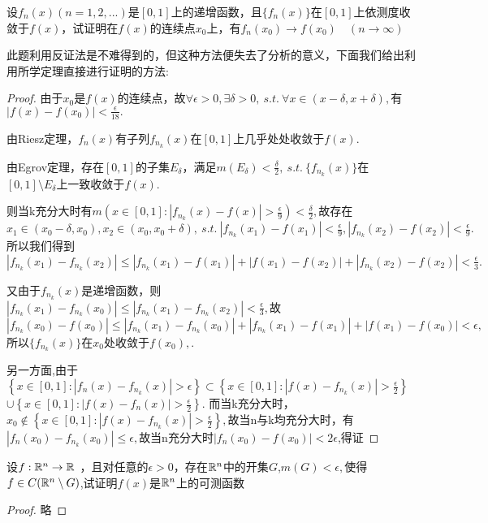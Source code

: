 设$f_n(x)(n=1,2,...)$是$[0,1]$上的递增函数，且$\{f_n(x)\}$在$[0,1]$上依测度收敛于$f(x)$，试证明在$f(x)$的连续点$x_0$上，有$f_n(x_0)\to f(x_0)\quad(n\to\infty)$\par
 此题利用反证法是不难得到的，但这种方法便失去了分析的意义，下面我们给出利用所学定理直接进行证明的方法:
\begin{proof}
	由于$x_0$是$f(x)$的连续点，故$\forall \epsilon>0,\exists\delta>0,\ s.t.\ \forall x\in(x-\delta,x+\delta),$有$\displaystyle{|f(x)-f(x_0)|<\frac{\epsilon}{18}}.\ $\par 由Riesz定理，$f_n(x)$有子列$f_{n_k}(x)$在$[0,1]$上几乎处处收敛于$f(x)$.\par 由Egrov定理，存在$[0,1]$的子集$E_\delta$，满足$\displaystyle{m(E_\delta)<\frac{\delta}{2}},\ s.t.\ \{f_{n_k}(x)\}$在$[0,1]\setminus E_\delta$上一致收敛于$f(x).$\par 则当k充分大时有$\displaystyle {m\left(x\in [0,1]:|f_{n_k}(x)-f(x)|>\frac{\epsilon}{9}  \right)<\frac{\delta}{2}} ,$故存在$x_1\in(x_0-\delta,x_0),x_2\in(x_0,x_0+\delta),\ s.t.\ \displaystyle{ |f_{n_k}(x_1)-f(x_1)|<\frac{\epsilon}{9}},\displaystyle{ |f_{n_k}(x_2)-f(x_2)|<\frac{\epsilon}{9}}.$ 
	所以我们得到$\displaystyle{|f_{n_k}(x_1)-f_{n_k}(x_2)|\leq |f_{n_k}(x_1)-f(x_1)|+|f(x_1)-f(x_2)|+|f_{n_k}(x_2)-f(x_2)|< \frac{\epsilon}{3}}.$\par 又由于$f_{n_k}(x)$是递增函数，则$\displaystyle{|f_{n_k}(x_1)-f_{n_k}(x_0)|\leq|f_{n_k}(x_1)-f_{n_k}(x_2)|< \frac{\epsilon}{3}},$故$|f_{n_k}(x_0)-f(x_0)|\leq |f_{n_k}(x_1)-f_{n_k}(x_0)|+|f_{n_k}(x_1)-f(x_1)|+|f(x_1)-f(x_0)|<\epsilon,$所以$\{f_{n_k}(x)\}$在$x_0$处收敛于$f(x_0),$.\par 
	另一方面,由于$\displaystyle{\left\lbrace x\in[0,1]:|f_n(x)-f_{n_k}(x)|>\epsilon\right\rbrace \subset \left\lbrace x\in [0,1]:|f(x)-f_{n_k}(x)|>\frac{\epsilon}{2}  \right\rbrace  }$\\ $\cup
	\displaystyle{ \left\lbrace x\in [0,1]:|f(x)-f_n(x)|>\frac{\epsilon}{2}  \right\rbrace}.$
	而当k充分大时，$\displaystyle{x_0\notin\left\lbrace x\in [0,1]:|f(x)-f_{n_k}(x)|>\frac{\epsilon}{2}  \right\rbrace,}$故当n与k均充分大时，有$|f_n(x_0)-f_{n_k}(x_0)|\leq\epsilon,$故当n充分大时$|f_n(x_0)-f(x_0)|<2\epsilon$,得证
\end{proof}


设$f:\R{R}{n}\to \R{R}{\ }$，且对任意的$\epsilon>0$，存在$\mathbb{R}^{n}$中的开集$G$,$m(G)<\epsilon,$使得$f\in C(\mathbb{R}^{n}\setminus G)$,试证明$f(x)$是$\mathbb{R}^{n}$上的可测函数
\begin{proof}
	略
\end{proof}


